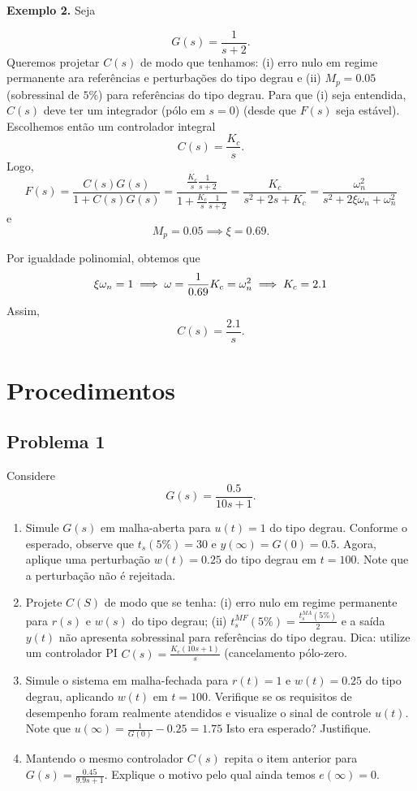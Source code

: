 \documentclass[
]{book}
\providecommand{\tightlist}{%
  \setlength{\itemsep}{0pt}\setlength{\parskip}{0pt}}
\begin{document}
\textbf{Exemplo 2.} Seja

\[
G(s) = \frac{1}{s+2}.
\]
Queremos projetar \(C(s)\) de modo que tenhamos: (i) erro nulo em regime permanente ara referências e perturbações do tipo degrau e (ii) \(M_p=0.05\) (sobressinal de \(5\%\)) para referências do tipo degrau. Para que (i) seja entendida, \(C(s)\) deve ter um integrador (pólo em \(s=0\)) (desde que \(F(s)\) seja estável). Escolhemos então um controlador integral
\[
C(s)=\frac{K_c}{s}.
\]
Logo,
\[
F(s) = \frac{C(s)G(s)}{1+C(s)G(s)} = \frac{\frac{K_c}{s}\frac{1}{s+2}}{1+\frac{K_c}{s}\frac{1}{s+2}} = \boxed{\frac{K_c}{s^2+2s+K_c} = \frac{\omega_n^2}{s^2+2\xi\omega_n+\omega^2_n}}
\]
e
\[
M_p=0.05 \implies \boxed{\xi = 0.69}.
\]

Por igualdade polinomial, obtemos que
\[
\xi\omega_n=1 \implies \omega = \frac{1}{0.69}\\
K_c=\omega_n^2 \implies K_c = 2.1
\]
Assim,
\[
\boxed{C(s)=\frac{2.1}{s}}.
\]

\hypertarget{procedimentos-3}{%
\section{Procedimentos}\label{procedimentos-3}}

\hypertarget{problema-1-3}{%
\subsection*{Problema 1}\label{problema-1-3}}

Considere
\[
G(s) = \frac {0.5}{10s+1}.
\]

\begin{enumerate}
\def\labelenumi{(\alph{enumi})}
\tightlist
\item
  Simule \(G(s)\) em malha-aberta para \(u(t) = 1\) do tipo degrau. Conforme o esperado, observe que \(t_s(5\%) = 30\) e \(y(\infty) = G(0) = 0.5\). Agora, aplique uma perturbação \(w(t) = 0.25\) do tipo degrau em \(t=100\). Note que a perturbação não é rejeitada.
\item
  Projete \(C(S)\) de modo que se tenha: (i) erro nulo em regime permanente para \(r(s)\) e \(w(s)\) do tipo degrau; (ii) \(t_s^{MF}(5\%) = \frac {t_s^{MA}(5\%)}{2}\) e a saída \(y(t)\) não apresenta sobressinal para referências do tipo degrau. Dica: utilize um controlador PI \(C(s) = \frac{K_c(10s+1)}{s}\) (cancelamento pólo-zero.
\item
  Simule o sistema em malha-fechada para \(r(t) =1\) e \(w(t) = 0.25\) do tipo degrau, aplicando \(w(t)\) em \(t=100\). Verifique se os requisitos de desempenho foram realmente atendidos e visualize o sinal de controle \(u(t)\). Note que \(u(\infty) = \frac {1}{G(0)}-0.25 = 1.75\) Isto era esperado? Justifique.
\item
  Mantendo o mesmo controlador \(C(s)\) repita o item anterior para \(G(s) = \frac {0.45}{9.9s+1}\). Explique o motivo pelo qual ainda temos \(e(\infty) = 0\).
\end{enumerate}
\end{document}
